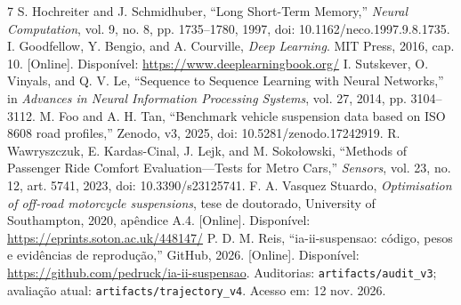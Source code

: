 \documentclass[conference]{IEEEtran}
\begin{document}
\begin{thebibliography}{7}
 S. Hochreiter and J. Schmidhuber, ``Long Short-Term Memory,'' \emph{Neural Computation}, vol. 9, no. 8, pp. 1735--1780, 1997, doi: 10.1162/neco.1997.9.8.1735.
 I. Goodfellow, Y. Bengio, and A. Courville, \emph{Deep Learning}. MIT Press, 2016, cap. 10. [Online]. Disponível: \url{https://www.deeplearningbook.org/}
 I. Sutskever, O. Vinyals, and Q. V. Le, ``Sequence to Sequence Learning with Neural Networks,'' in \emph{Advances in Neural Information Processing Systems}, vol. 27, 2014, pp. 3104--3112.
 M. Foo and A. H. Tan, ``Benchmark vehicle suspension data based on ISO 8608 road profiles,'' Zenodo, v3, 2025, doi: 10.5281/zenodo.17242919.
 R. Wawryszczuk, E. Kardas-Cinal, J. Lejk, and M. Soko\l{}owski, ``Methods of Passenger Ride Comfort Evaluation---Tests for Metro Cars,'' \emph{Sensors}, vol. 23, no. 12, art. 5741, 2023, doi: 10.3390/s23125741.
 F. A. Vasquez Stuardo, \emph{Optimisation of off-road motorcycle suspensions}, tese de doutorado, University of Southampton, 2020, apêndice A.4. [Online]. Disponível: \url{https://eprints.soton.ac.uk/448147/}
 P. D. M. Reis, ``ia-ii-suspensao: código, pesos e evidências de reprodução,'' GitHub, 2026. [Online]. Disponível: \url{https://github.com/pedruck/ia-ii-suspensao}. Auditorias: \texttt{artifacts/audit\_v3}; avaliação atual: \texttt{artifacts/trajectory\_v4}. Acesso em: 12 nov. 2026.
\end{thebibliography}
\end{document}
